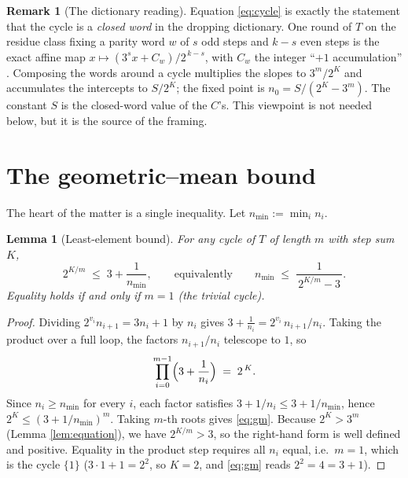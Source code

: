 \documentclass[11pt]{article}
\newtheorem{lemma}{Lemma}
\theoremstyle{definition}
\newtheorem{remark}{Remark}
\newcommand{\nmin}{n_{\min}}
\begin{document}
\begin{remark}[The dictionary reading]
Equation \eqref{eq:cycle} is exactly the statement that the cycle is a
\emph{closed word} in the dropping dictionary. One round of $T$ on the residue
class fixing a parity word $w$ of $s$ odd steps and $k-s$ even steps is the exact
affine map $x \mapsto (3^{s}x + C_w)/2^{\,k-s}$, with $C_w$ the integer
``$+1$ accumulation'' \cite{affine}. Composing the words around a cycle multiplies
the slopes to $3^{m}/2^{K}$ and accumulates the intercepts to $S/2^{K}$; the fixed
point is $n_0 = S/(2^{K}-3^{m})$. The constant $S$ is the closed-word value of the
$C$'s. This viewpoint is not needed below, but it is the source of the framing.
\end{remark}

\section{The geometric--mean bound}\label{sec:bound}

The heart of the matter is a single inequality. Let $\nmin := \min_i n_i$.

\begin{lemma}[Least-element bound]\label{lem:gm}
For any cycle of $T$ of length $m$ with step sum $K$,
\begin{equation}\label{eq:gm}
  2^{K/m} \;\le\; 3 + \frac1{\nmin},
  \qquad\text{equivalently}\qquad
  \nmin \;\le\; \frac{1}{\,2^{K/m}-3\,}.
\end{equation}
Equality holds if and only if $m=1$ (the trivial cycle).
\end{lemma}

\begin{proof}
Dividing $2^{v_i} n_{i+1} = 3 n_i + 1$ by $n_i$ gives
$3 + \tfrac1{n_i} = 2^{v_i}\, n_{i+1}/n_i$. Taking the product over a full loop,
the factors $n_{i+1}/n_i$ telescope to $1$, so
\begin{equation}\label{eq:product}
  \prod_{i=0}^{m-1}\Bigl(3 + \frac1{n_i}\Bigr) \;=\; 2^{\,K}.
\end{equation}
Since $n_i \ge \nmin$ for every $i$, each factor satisfies
$3 + 1/n_i \le 3 + 1/\nmin$, hence
$2^{K} \le (3 + 1/\nmin)^{m}$. Taking $m$-th roots gives \eqref{eq:gm}.
Because $2^{K}>3^{m}$ (Lemma \ref{lem:equation}), we have $2^{K/m}>3$, so the
right-hand form is well defined and positive. Equality in the product step
requires all $n_i$ equal, i.e.\ $m=1$, which is the cycle $\{1\}$
($3\cdot1+1 = 2^{2}$, so $K=2$, and \eqref{eq:gm} reads $2^{2}= 4 = 3+1$).
\end{proof}
\end{document}
